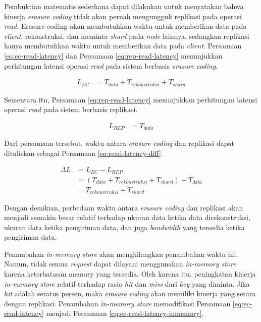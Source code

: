 \begin{enumerate}
	      Pembuktian matematis sederhana dapat dilakukan untuk menyatakan bahwa kinerja \textit{erasure coding} tidak akan pernah mengungguli replikasi pada operasi \textit{read}. Erasure coding akan membutuhkan waktu untuk memberikan data pada \textit{client}, rekonstruksi, dan meminta \textit{shard} pada \textit{node} lainnya, sedangkan replikasi hanya membutuhkan waktu untuk memberikan data pada \textit{client}. Persamaan \ref{eq:ec-read-latency} dan Persamaan \ref{eq:rep-read-latency} menunjukkan perhitungan latensi operasi \textit{read} pada sistem berbasis \textit{erasure coding}.

	      \begin{align}
		      L_{EC} & = T_{data} + T_{rekonstruksi} + T_{shard}
		      \label{eq:ec-read-latency}
	      \end{align}

	      Sementara itu, Persamaan \ref{eq:rep-read-latency} menunjukkan perhitungan latensi operasi \textit{read} pada sistem berbasis replikasi.

	      \begin{align}
		      L_{REP} & = T_{data}
		      \label{eq:rep-read-latency}
	      \end{align}

	      Dari persamaan tersebut, waktu antara \textit{erasure coding} dan replikasi dapat dituliskan sebagai Persamaan \ref{eq:read-latency-diff}.

	      \begin{align}
		      \Delta L & = L_{EC} - L_{REP}                                     \\
		               & = (T_{data} + T_{rekonstruksi} + T_{shard}) - T_{data} \\
		               & = T_{rekonstruksi} + T_{shard}
		      \label{eq:read-latency-diff}
	      \end{align}

	      Dengan demikian, perbedaan waktu antara \textit{erasure coding} dan replikasi akan menjadi semakin besar relatif terhadap ukuran data ketika data direkonstruksi, ukuran data ketika pengiriman data, dan juga \textit{bandwidth} yang tersedia ketika pengiriman data.

	      Penambahan \textit{in-memory store} akan menghilangkan penambahan waktu ini. Namun, tidak semua \textit{request} dapat dilayani menggunakan \textit{in-memory store} karena keterbatasan memory yang tersedia. Oleh karena itu, peningkatan kinerja \textit{in-memory store} relatif terhadap rasio \textit{hit} dan \textit{miss} dari \textit{key} yang diminta. Jika \textit{hit} adalah seratus persen, maka \textit{erasure coding} akan memiliki kinerja yang setara dengan replikasi. Penambahan \textit{in-memory store} memodifikasi Persamaan \ref{eq:ec-read-latency} menjadi Persamaan \ref{eq:ec-read-latency-inmemory}.


\end{enumerate}
